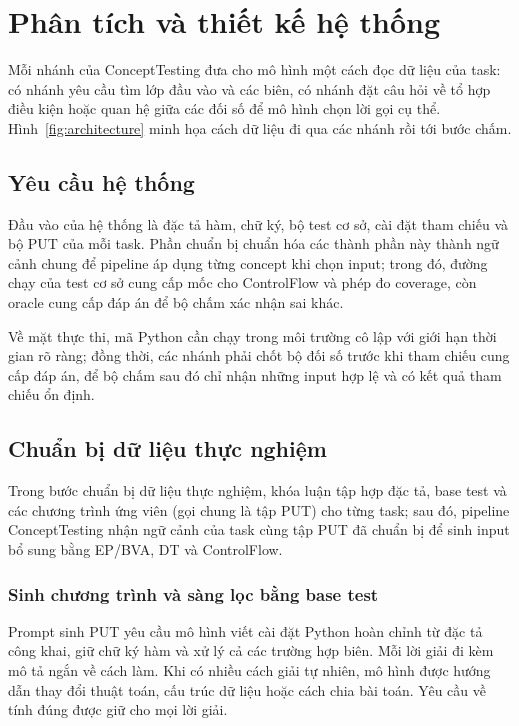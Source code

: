 \chapter{Phân tích và thiết kế hệ thống}
\label{chap:method}

Mỗi nhánh của ConceptTesting đưa cho mô hình một cách đọc dữ liệu của task: có nhánh yêu cầu tìm lớp đầu vào và các biên, có nhánh đặt câu hỏi về tổ hợp điều kiện hoặc quan hệ giữa các đối số để mô hình chọn lời gọi cụ thể. Hình~\ref{fig:architecture} minh họa cách dữ liệu đi qua các nhánh rồi tới bước chấm.

\section{Yêu cầu hệ thống}

Đầu vào của hệ thống là đặc tả hàm, chữ ký, bộ test cơ sở, cài đặt tham chiếu và bộ PUT của mỗi task. Phần chuẩn bị chuẩn hóa các thành phần này thành ngữ cảnh chung để pipeline áp dụng từng concept khi chọn input; trong đó, đường chạy của test cơ sở cung cấp mốc cho ControlFlow và phép đo coverage, còn oracle cung cấp đáp án để bộ chấm xác nhận sai khác.

Về mặt thực thi, mã Python cần chạy trong môi trường cô lập với giới hạn thời gian rõ ràng; đồng thời, các nhánh phải chốt bộ đối số trước khi tham chiếu cung cấp đáp án, để bộ chấm sau đó chỉ nhận những input hợp lệ và có kết quả tham chiếu ổn định.

\section{Chuẩn bị dữ liệu thực nghiệm}
\label{sec:put-generation}

Trong bước chuẩn bị dữ liệu thực nghiệm, khóa luận tập hợp đặc tả, base test và các chương trình ứng viên (gọi chung là tập PUT) cho từng task; sau đó, pipeline ConceptTesting nhận ngữ cảnh của task cùng tập PUT đã chuẩn bị để sinh input bổ sung bằng EP/BVA, DT và ControlFlow.

\subsection{Sinh chương trình và sàng lọc bằng base test}

Prompt sinh PUT yêu cầu mô hình viết cài đặt Python hoàn chỉnh từ đặc tả công khai, giữ chữ ký hàm và xử lý cả các trường hợp biên. Mỗi lời giải đi kèm mô tả ngắn về cách làm. Khi có nhiều cách giải tự nhiên, mô hình được hướng dẫn thay đổi thuật toán, cấu trúc dữ liệu hoặc cách chia bài toán. Yêu cầu về tính đúng được giữ cho mọi lời giải.

